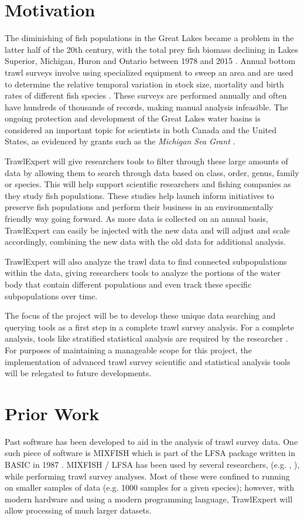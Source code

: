 \documentclass{article}
\begin{document}
\section{Motivation}
The diminishing of fish populations in the Great Lakes became a problem in the latter half of the 20th century, with the total prey fish biomass declining in Lakes Superior, Michigan, Huron and Ontario between 1978 and 2015 \citep{michigan2017}. Annual bottom trawl surveys involve using specialized equipment to sweep an area and are used to determine the relative temporal variation in stock size, mortality and birth rates of different fish species \citep{walsh1997efficiency}. These surveys are performed annually and often have hundreds of thousands of records, making manual analysis infeasible. The ongoing protection and development of the Great Lakes water basins is considered an important topic for scientists in both Canada and the United States, as evidenced by grants such as the \textit{Michigan Sea Grant} \citep{michseagr2018}.

TrawlExpert will give researchers tools to filter through these large amounts of data by allowing them to search through data based on class, order, genus, family or species. This will help support scientific researchers and fishing companies as they study fish populations. These studies help launch inform initiatives to preserve fish populations and perform their business in an environmentally friendly way going forward. As more data is collected on an annual basis, TrawlExpert can easily be injected with the new data and will adjust and scale accordingly, combining the new data with the old data for additional analysis.

TrawlExpert will also analyze the trawl data to find connected subpopulations within the data, giving researchers tools to analyze the portions of the water body that contain different populations and even track these specific subpopulations over time.

The focus of the project will be to develop these unique data searching and querying tools as a first step in a complete trawl survey analysis. For a complete analysis, tools like stratified statistical analysis are required by the researcher \citep{walsh1997efficiency}. For purposes of maintaining a manageable scope for this project, the implementation of advanced trawl survey scientific and statistical analysis tools will be relegated to future developments. 

\section{Prior Work}
Past software has been developed to aid in the analysis of trawl survey data. One such piece of software is MIXFISH which is part of the LFSA package written in BASIC in 1987 \citep{sparre1987computer}. MIXFISH / LFSA has been used by several researchers, (e.g. \citeauthor{levi1993analysis}, \citeauthor{chakraborty1996stock}), while performing trawl survey analyses. Most of these were confined to running on smaller samples of data (e.g. 1000 samples for a given species); however, with modern hardware and using a modern programming language, TrawlExpert will allow processing of much larger datasets.
\end{document}
